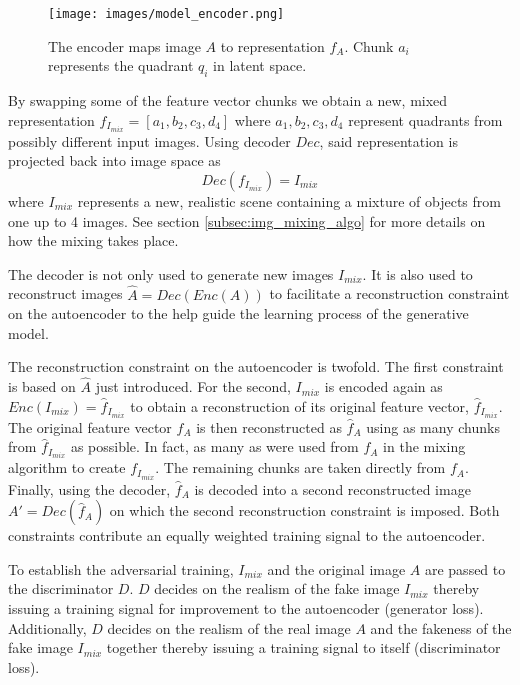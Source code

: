 \documentclass[12pt,a4paper]{article}
\begin{document}
\begin{figure}[ht]
\centering
\texttt{[image: images/model\_encoder.png]}
\caption{The encoder maps image $A$ to representation $f_A$. Chunk $a_i$ represents the quadrant $q_i$ in latent space.}
\label{fig:encoder}
\end{figure}

By swapping some of the feature vector chunks we obtain a new, mixed representation $f_{I_{mix}} = [a_1, b_2, c_3, d_4]$ where $a_1,b_2,c_3,d_4$ represent quadrants from possibly different input images. Using decoder $Dec$, said representation is projected back into image space as
\begin{equation} \label{eq:3}
    Dec(f_{I_{mix}}) = I_{mix}
\end{equation}
where $I_{mix}$ represents a new, realistic scene containing a mixture of objects from one up to 4 images. See section \ref{subsec:img_mixing_algo} for more details on how the mixing takes place.

The decoder is not only used to generate new images $I_{mix}$. It is also used to reconstruct images $\hat{A} = Dec(Enc(A))$ to facilitate a reconstruction constraint on the autoencoder to the help guide the learning process of the generative model.

The reconstruction constraint on the autoencoder is twofold. The first constraint is based on $\hat{A}$ just introduced. For the second, $I_{mix}$ is encoded again as $Enc(I_{mix}) = \hat{f}_{I_{mix}}$ to obtain a reconstruction of its original feature vector, $\hat{f}_{I_{mix}}$. The original feature vector $f_A$ is then reconstructed as $\hat{f}_A$ using as many chunks from $\hat{f}_{I_{mix}}$ as possible. In fact, as many as were used from $f_A$ in the mixing algorithm to create $f_{I_{mix}}$. The remaining chunks are taken directly from $f_A$. Finally, using the decoder, $\hat{f}_A$ is decoded into a second reconstructed image $A' = Dec(\hat{f}_A)$ on which the second reconstruction constraint is imposed. Both constraints contribute an equally weighted training signal to the autoencoder.

To establish the adversarial training, $I_{mix}$ and the original image $A$ are passed to the discriminator $D$. $D$ decides on the realism of the fake image $I_{mix}$ thereby issuing a training signal for improvement to the autoencoder (generator loss). Additionally, $D$ decides on the realism of the real image $A$ and the fakeness of the fake image $I_{mix}$ together thereby issuing a training signal to itself (discriminator loss).
\end{document}
